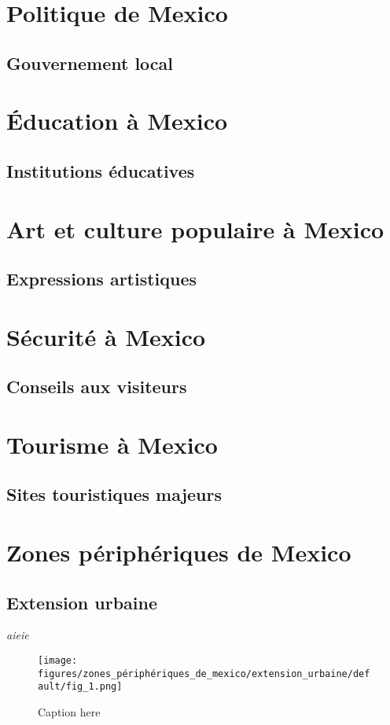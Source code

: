 \documentclass[12pt, a4paper]{article}
\begin{document}
\section{Politique de Mexico}
\subsection{Gouvernement local}
\section{Éducation à Mexico}
\subsection{Institutions éducatives}
\section{Art et culture populaire à Mexico}
\subsection{Expressions artistiques}
\section{Sécurité à Mexico}
\subsection{Conseils aux visiteurs}
\section{Tourisme à Mexico}
\subsection{Sites touristiques majeurs}
\section{Zones périphériques de Mexico}
\subsection{Extension urbaine}
\textit{aieie}


\begin{figure}[h!]
    \centering
    \texttt{[image: figures/zones\_périphériques\_de\_mexico/extension\_urbaine/default/fig\_1.png]}
    \caption{Caption here}
    \label{fig:zones_périphériques_de_mexico_extension_urbaine_1}
\end{figure}
\end{document}
